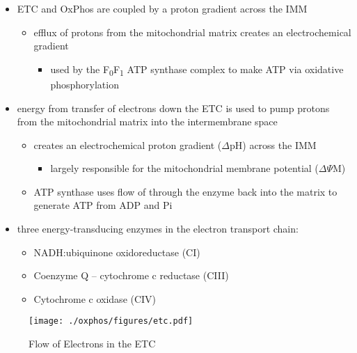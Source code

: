 \documentclass[12pt]{scrartcl}
\begin{document}
\begin{itemize}
\item ETC and OxPhos are coupled by a proton gradient across the IMM
\begin{itemize}
\item efflux of protons from the mitochondrial matrix creates an
electrochemical gradient
\begin{itemize}
\item used by the F\textsubscript{0}F\textsubscript{1} ATP synthase complex to make ATP via oxidative phosphorylation
\end{itemize}
\end{itemize}
\item energy from transfer of electrons down the ETC is used to pump
protons from the mitochondrial matrix into the intermembrane space
\begin{itemize}
\item creates an electrochemical proton gradient (\(\Delta\)pH) across the IMM
\begin{itemize}
\item largely responsible for the mitochondrial membrane potential (\(\Delta \Psi\)M)
\end{itemize}
\item ATP synthase uses flow of  through the enzyme back into the
matrix to generate ATP from ADP and Pi
\end{itemize}
\item three energy-transducing enzymes in the electron transport chain:
\begin{itemize}
\item NADH:ubiquinone oxidoreductase (CI)
\item Coenzyme Q – cytochrome c reductase (CIII)
\item Cytochrome c oxidase (CIV)
\end{itemize}
\end{itemize}


\begin{figure}[htbp]
\centering
\texttt{[image: ./oxphos/figures/etc.pdf]}
\caption{\label{fig:org7aa7654}Flow of Electrons in the ETC}
\end{figure}
\end{document}
